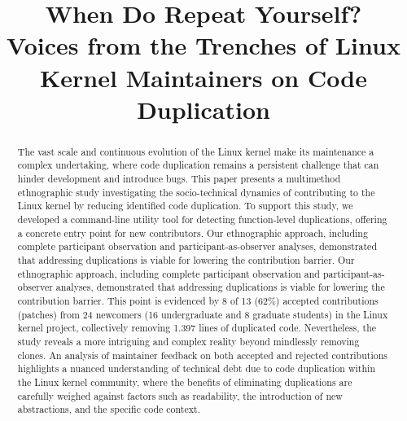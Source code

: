 \documentclass[10pt,conference]{IEEEtran}
\begin{document}
\title{When Do Repeat Yourself?\\
Voices from the Trenches of Linux Kernel Maintainers on Code Duplication}



\author{}


\maketitle

\begin{abstract}
The vast scale and continuous evolution of the Linux kernel make its maintenance a complex undertaking, where code duplication remains a persistent challenge that can hinder development and introduce bugs. This paper presents a multimethod ethnographic study investigating the socio-technical dynamics of contributing to the Linux kernel by reducing identified code duplication. To support this study, we developed a command-line utility tool for detecting function-level duplications, offering a concrete entry point for new contributors. Our ethnographic approach, including complete participant observation and participant-as-observer analyses, demonstrated that addressing duplications is viable for lowering the contribution barrier. Our ethnographic approach, including complete participant observation and participant-as-observer analyses, demonstrated that addressing duplications is viable for lowering the contribution barrier. This point is evidenced by 8 of 13 (62\%) accepted contributions (patches) from 24 newcomers (16 undergraduate and 8 graduate students) in the Linux kernel project, collectively removing 1.397 lines of duplicated code. Nevertheless, the study reveals a more intriguing and complex reality beyond mindlessly removing clones. An analysis of maintainer feedback on both accepted and rejected contributions highlights a nuanced understanding of technical debt due to code duplication within the Linux kernel community, where the benefits of eliminating duplications are carefully weighed against factors such as readability, the introduction of new abstractions, and the specific code context.
\end{abstract}
\end{document}
